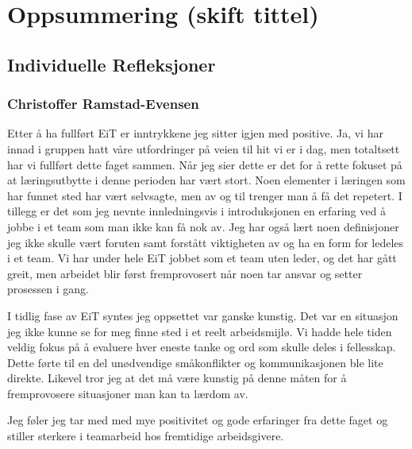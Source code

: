\chapter{Oppsummering (skift tittel)}

\section{Individuelle Refleksjoner}

\subsection*{Christoffer Ramstad-Evensen}

Etter å ha fullført EiT er inntrykkene jeg sitter igjen med positive. Ja, vi har innad i gruppen hatt våre utfordringer
på veien til hit vi er i dag, men totaltsett har vi fullført dette faget sammen. Når jeg sier dette er det for å rette 
fokuset på at læringsutbytte i denne perioden har vært stort. Noen elementer i læringen som har funnet sted
har vært selvsagte, men av og til trenger man å få det repetert. I tillegg er det som jeg nevnte innledningsvis
i introduksjonen en erfaring ved å jobbe i et team som man ikke kan få nok av. Jeg har også lært noen 
definisjoner jeg ikke skulle vært foruten samt forstått viktigheten av og ha en form for ledeles i et team. 
Vi har under hele EiT jobbet som et team uten leder, og det har gått greit, men arbeidet blir først fremprovosert
når noen tar ansvar og setter prosessen i gang. 

I tidlig fase av EiT syntes jeg oppsettet var ganske kunstig. Det var en situasjon jeg ikke kunne se for meg
finne sted i et reelt arbeidsmijlø. Vi hadde hele tiden veldig fokus på å evaluere hver eneste tanke og ord som
skulle deles i fellesskap. Dette førte til en del unødvendige småkonflikter og kommunikasjonen ble lite direkte. 
Likevel tror jeg at det må være kunstig på denne måten for å fremprovosere situasjoner man kan ta lærdom av.

Jeg føler jeg tar med med mye positivitet og gode erfaringer fra dette faget og stiller sterkere i teamarbeid hos
fremtidige arbeidsgivere.

